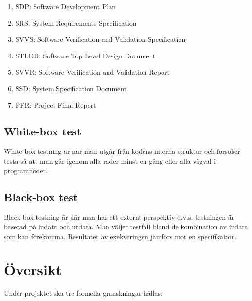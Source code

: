 \documentclass[a4paper]{article}
\begin{document}
\begin{enumerate}

\item SDP: Software Development Plan

\item SRS: System Requirements Specification

\item SVVS: Software Verification and Validation Specification

\item STLDD: Software Top Level Design Document

\item SVVR: Software Verification and Validation Report

\item SSD: System Specification Document

\item PFR: Project Final Report


\end{enumerate}

\subsection{White-box test}

White-box testning är när man utgår från kodens interna struktur och försöker testa så att man går igenom alla rader minst en gång eller alla vägval i programflödet.

\subsection{Black-box test}

Black-box testning är där man har ett externt perspektiv d.v.s. testningen är baserad på indata och utdata. Man väljer testfall bland de kombination av indata som kan förekomma. Resultatet av exekveringen jämförs mot en specifikation.


\section{Översikt}

Under projektet ska tre formella granskningar hållas:
\end{document}
